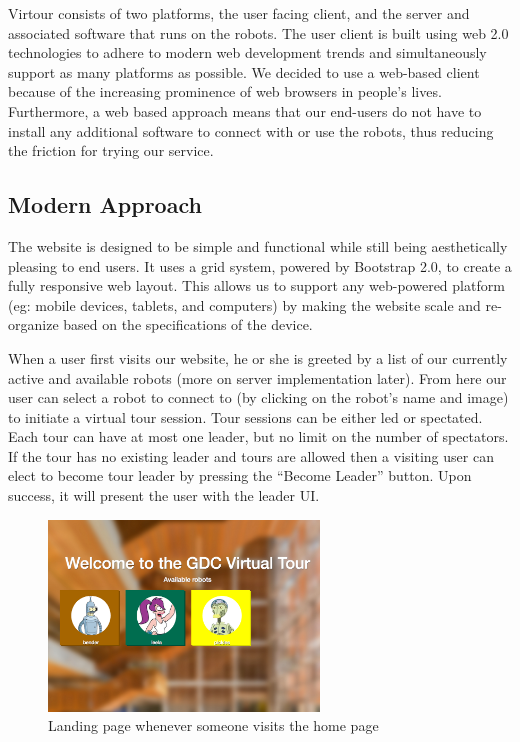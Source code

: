 \documentclass{sig-alternate-05-2015}
\begin{document}
Virtour consists of two platforms, the user facing client, and the server
and associated software that runs on the robots. The user client is built using
web 2.0 technologies to adhere to modern web development trends and
simultaneously support as many platforms as possible. We decided to use a
web-based client because of the increasing prominence of web browsers in
people's lives. Furthermore, a web based approach means that our end-users do
not have to install any additional software to connect with or use the robots,
thus reducing the friction for trying our service.

\subsection{Modern Approach}

The website is designed to be simple and functional while still being
aesthetically pleasing to end users. It uses a grid system, powered by
Bootstrap 2.0, to create a fully responsive web layout. This allows us to
support any web-powered platform (eg: mobile devices, tablets, and computers)
by making the website scale and re-organize based on the specifications of the
device.

When a user first visits our website, he or she is greeted by a list of our
currently active and available robots (more on server implementation later).
From here our user can select a robot to connect to (by clicking on the robot's
name and image) to initiate a virtual tour session. Tour sessions can be either
led or spectated. Each tour can have at most one leader, but no limit on the
number of spectators. If the tour has no existing leader and tours are allowed
then a visiting user can elect to become tour leader by pressing the ``Become
Leader'' button. Upon success, it will present the user with the leader UI.

\begin{figure}
\centering
\includegraphics[height=2in]{tour_homepage}
\caption{Landing page whenever someone visits the home page}
\end{figure}
\end{document}
